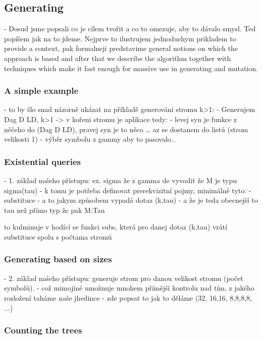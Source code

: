 \documentclass[a4paper,oneside]{memoir}
\begin{document}
\subsection{Generating}

- Dosud jsme popsali co je cílem tvořit a co to omezuje, aby to dávalo smysl. Ted popíšem jak na to jdeme. Nejprve to ilustrujem jednoduchym prikladem to provide a context, pak formalneji predstavime general notions on which the approach is based and after that we describe the algorithm together with techniques which make it fast enough for massive use in generating and mutation.

\subsubsection{A simple example}

- to by šlo snad názorně ukázat na příkladě generování stromu k>1:
- Generujem Dag D LD, k>1 -> v kořeni stromu je aplikace tedy:
- levej syn je funkce z něčeho do (Dag D LD), pravej syn je to něco
… az se dostanem do listů (strom velikosti 1) - výběr symbolu z gammy aby to pasovalo..

\subsubsection{Existential queries}

- 1. základ našeho přístupu: ex. sigma že z gamma de vyvodit že M je typu sigma(tau)
  - k tomu je potřeba definovat prerekvizitní pojmy, minimálně tyto:
    - substituce
    - a to jakym způsobem vypadá dotaz (k,tau) - a že je teda obecnejší to tau než přímo typ že pak M:Tau

to kulminuje v hodící se funkci subs, která pro danej dotaz (k,tau) vrátí substituce spolu s počtama stromů


\subsubsection{Generating based on sizes}

- 2. základ našeho přístupu: generuje strom pro danou velikost stromu (počet symbolů).
  - což mimojiné umožnuje mnohem přímější kontrolu nad tím, z jakého rozložení taháme naše jhedince 
  - zde popsat to jak to děláme (32, 16,16, 8,8,8,8, ...)

\subsubsection{Counting the trees}
\end{document}
